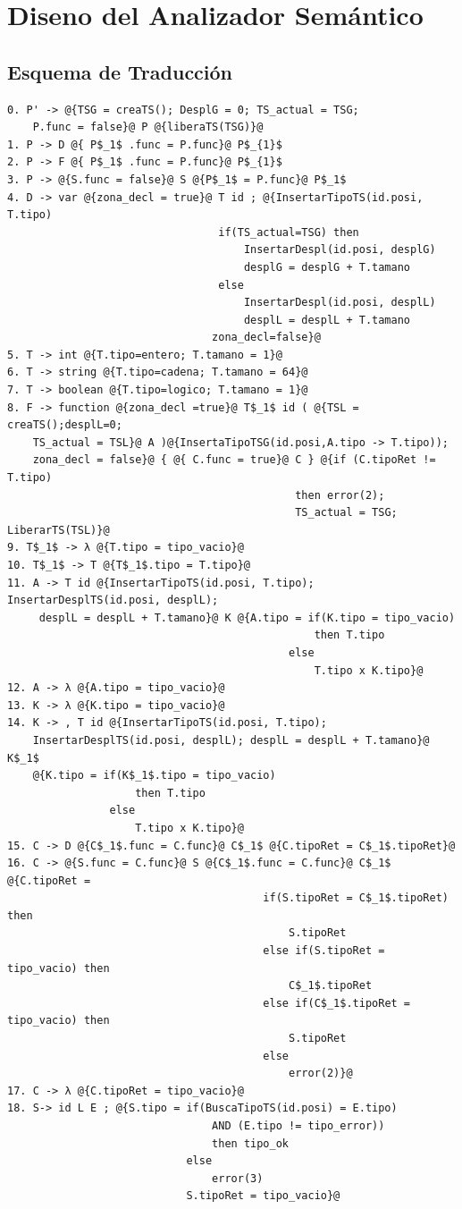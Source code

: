 
\section{Diseno del Analizador Semántico}
\subsection{Esquema de Traducción}
\begin{lstlisting}[style=EdT]
0. P' -> @{TSG = creaTS(); DesplG = 0; TS_actual = TSG;
    P.func = false}@ P @{liberaTS(TSG)}@
1. P -> D @{ P$_1$ .func = P.func}@ P$_{1}$
2. P -> F @{ P$_1$ .func = P.func}@ P$_{1}$
3. P -> @{S.func = false}@ S @{P$_1$ = P.func}@ P$_1$
4. D -> var @{zona_decl = true}@ T id ; @{InsertarTipoTS(id.posi, T.tipo)
       							 if(TS_actual=TSG) then
           							 InsertarDespl(id.posi, desplG)
           							 desplG = desplG + T.tamano
      						     else
           							 InsertarDespl(id.posi, desplL)
            						 desplL = desplL + T.tamano
        						zona_decl=false}@
5. T -> int @{T.tipo=entero; T.tamano = 1}@
6. T -> string @{T.tipo=cadena; T.tamano = 64}@
7. T -> boolean @{T.tipo=logico; T.tamano = 1}@
8. F -> function @{zona_decl =true}@ T$_1$ id ( @{TSL = creaTS();desplL=0;
	TS_actual = TSL}@ A )@{InsertaTipoTSG(id.posi,A.tipo -> T.tipo));
    zona_decl = false}@ { @{ C.func = true}@ C } @{if (C.tipoRet != T.tipo)
   											 then error(2);
   											 TS_actual = TSG; LiberarTS(TSL)}@
9. T$_1$ -> λ @{T.tipo = tipo_vacio}@
10. T$_1$ -> T @{T$_1$.tipo = T.tipo}@
11. A -> T id @{InsertarTipoTS(id.posi, T.tipo); InsertarDesplTS(id.posi, desplL);
     desplL = desplL + T.tamano}@ K @{A.tipo = if(K.tipo = tipo_vacio)
                            					then T.tipo
                         					else
                             					T.tipo x K.tipo}@
12. A -> λ @{A.tipo = tipo_vacio}@
13. K -> λ @{K.tipo = tipo_vacio}@
14. K -> , T id @{InsertarTipoTS(id.posi, T.tipo);
	InsertarDesplTS(id.posi, desplL); desplL = desplL + T.tamano}@ K$_1$ 
	@{K.tipo = if(K$_1$.tipo = tipo_vacio)
     				then T.tipo
          		else
            		T.tipo x K.tipo}@
15. C -> D @{C$_1$.func = C.func}@ C$_1$ @{C.tipoRet = C$_1$.tipoRet}@
16. C -> @{S.func = C.func}@ S @{C$_1$.func = C.func}@ C$_1$ @{C.tipoRet =
        								if(S.tipoRet = C$_1$.tipoRet) then
           									S.tipoRet
       									else if(S.tipoRet = tipo_vacio) then
           									C$_1$.tipoRet
        								else if(C$_1$.tipoRet = tipo_vacio) then
           									S.tipoRet
        								else
           									error(2)}@
17. C -> λ @{C.tipoRet = tipo_vacio}@
18. S-> id L E ; @{S.tipo = if(BuscaTipoTS(id.posi) = E.tipo) 
								AND (E.tipo != tipo_error))
								then tipo_ok
     						else
        						error(3)
        					S.tipoRet = tipo_vacio}@
        					

\end{lstlisting}

